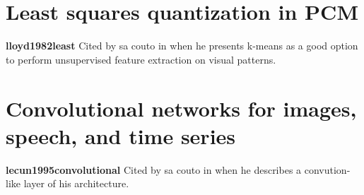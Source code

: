 \documentclass{article}
\begin{document}
\section{Least squares quantization in PCM}
\textbf{lloyd1982least} \cite{lloyd1982least}\newline
Cited by sa couto in \cite{sa2020storing} when he presents k-means as a good option to perform unsupervised feature extraction on visual patterns.  

\section{Convolutional networks for images, speech, and time series}
\textbf{lecun1995convolutional} \cite{lecun1995convolutional}\newline
Cited by sa couto in \cite{sa2020storing} when he describes a convution-like layer of his architecture. 
\end{document}

